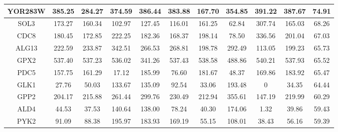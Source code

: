 \begin{table}[H]
\begin{center}
{\begin{tabular}{|c|c|c|c|c|c|c|c|c|c|c|}
YOR283W         & 385.25             & 284.27             & 374.59            & 386.44                     & 383.88        & 167.70          & 354.85                 & 391.22          & 387.67            & 74.91        \\ \hline
SOL3            & 173.27             & 160.34             & 102.97            & 127.45                     & 116.01        & 161.25          & 62.84                  & 307.74          & 165.03            & 68.26        \\ \hline
CDC8            & 180.45             & 172.85             & 222.25            & 182.36                     & 168.37        & 198.14          & 78.50                  & 336.56          & 201.04            & 67.03        \\ \hline
ALG13           & 222.59             & 233.87             & 342.51            & 266.53                     & 268.81        & 198.78          & 292.49                 & 113.05          & 199.23            & 65.73        \\ \hline
GPX2            & 537.40             & 537.23             & 536.02            & 341.26                     & 537.43        & 538.58          & 488.86                 & 540.21          & 537.93            & 65.52        \\ \hline
PDC5            & 157.75             & 161.29             & 17.12             & 185.99                     & 76.60         & 181.67          & 48.37                  & 169.86          & 183.92            & 65.47        \\ \hline
GLK1            & 27.76              & 50.03              & 133.67            & 135.09                     & 92.54         & 33.06           & 193.48                 & 0               & 34.35             & 64.44        \\ \hline
GPP2            & 204.17             & 215.88             & 261.44            & 299.76                     & 230.49        & 212.94          & 355.61                 & 147.19          & 219.99            & 60.29        \\ \hline
ALD4            & 44.53              & 37.53              & 140.64            & 138.00                     & 78.24         & 40.30           & 174.06                 & 1.32            & 39.86             & 59.43        \\ \hline
PYK2            & 91.09              & 88.38              & 195.97            & 183.93                     & 169.19        & 55.15           & 108.01                 & 38.43           & 56.16             & 59.39        \\ \hline

\end{tabular}}
\end{center}
\end{table}
